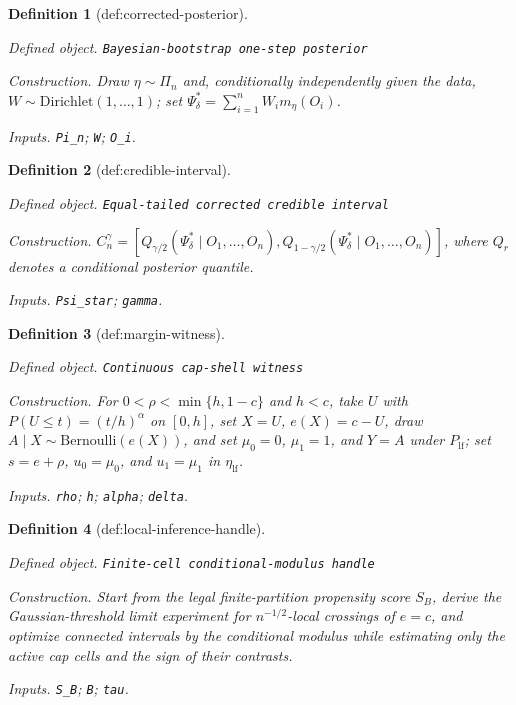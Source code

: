 \documentclass{article}
\newtheorem{definition}{Definition}
\begin{document}
\begin{definition}[def:corrected-posterior]\label{def:corrected-posterior}
\par\smallskip\noindent\emph{Defined object.} \texttt{Bayesian-\allowbreak{}bootstrap one-\allowbreak{}step posterior}
\par\smallskip\noindent\emph{Construction.} Draw \(\eta\sim\Pi_n\) and, conditionally independently given the data, \(W\sim\mathrm{Dirichlet}(1,\ldots,1)\); set \(\Psi_\delta^*=\sum_{i=1}^nW_i m_\eta(O_i)\).
\par\smallskip\noindent\emph{Inputs.} \texttt{Pi\_\allowbreak{}n}; \texttt{W}; \texttt{O\_\allowbreak{}i}.
\end{definition}

\begin{definition}[def:credible-interval]\label{def:credible-interval}
\par\smallskip\noindent\emph{Defined object.} \texttt{Equal-\allowbreak{}tailed corrected credible interval}
\par\smallskip\noindent\emph{Construction.} \(C_n^\gamma=[Q_{\gamma/2}(\Psi_\delta^*\mid O_1,\ldots,O_n),Q_{1-\gamma/2}(\Psi_\delta^*\mid O_1,\ldots,O_n)]\), where \(Q_r\) denotes a conditional posterior quantile.
\par\smallskip\noindent\emph{Inputs.} \texttt{Psi\_\allowbreak{}star}; \texttt{gamma}.
\end{definition}

\begin{definition}[def:margin-witness]\label{def:margin-witness}
\par\smallskip\noindent\emph{Defined object.} \texttt{Continuous cap-\allowbreak{}shell witness}
\par\smallskip\noindent\emph{Construction.} For \(0<\rho<\min\{h,1-c\}\) and \(h<c\), take \(U\) with \(P(U\le t)=(t/h)^\alpha\) on \([0,h]\), set \(X=U\), \(e(X)=c-U\), draw \(A\mid X\sim\mathrm{Bernoulli}(e(X))\), and set \(\mu_0=0\), \(\mu_1=1\), and \(Y=A\) under \(P_{\mathrm{lf}}\); set \(s=e+\rho\), \(u_0=\mu_0\), and \(u_1=\mu_1\) in \(\eta_{\mathrm{lf}}\).
\par\smallskip\noindent\emph{Inputs.} \texttt{rho}; \texttt{h}; \texttt{alpha}; \texttt{delta}.
\end{definition}

\begin{definition}[def:local-inference-handle]\label{def:local-inference-handle}
\par\smallskip\noindent\emph{Defined object.} \texttt{Finite-\allowbreak{}cell conditional-\allowbreak{}modulus handle}
\par\smallskip\noindent\emph{Construction.} Start from the legal finite-partition propensity score \(S_B\), derive the Gaussian-threshold limit experiment for \(n^{-1/2}\)-local crossings of \(e=c\), and optimize connected intervals by the conditional modulus while estimating only the active cap cells and the sign of their contrasts.
\par\smallskip\noindent\emph{Inputs.} \texttt{S\_\allowbreak{}B}; \texttt{B}; \texttt{tau}.
\end{definition}
\end{document}
